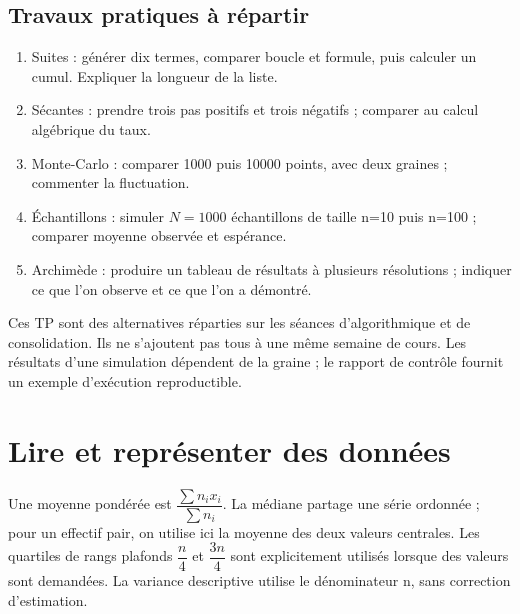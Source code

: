 \subsection*{Travaux pratiques à répartir}\label{TP}
\begin{enumerate}
\item Suites : générer dix termes, comparer boucle et formule, puis calculer un cumul. Expliquer la longueur de la liste.
\item Sécantes : prendre trois pas positifs et trois négatifs ; comparer au calcul algébrique du taux.
\item Monte-Carlo : comparer \num{1000} puis \num{10000} points, avec deux graines ; commenter la fluctuation.
\item Échantillons : simuler $N=\num{1000}$ échantillons de taille n=10 puis n=100 ; comparer moyenne observée et espérance.
\item Archimède : produire un tableau de résultats à plusieurs résolutions ; indiquer ce que l’on observe et ce que l’on a démontré.
\end{enumerate}
Ces TP sont des alternatives réparties sur les séances d’algorithmique et de consolidation. Ils ne s’ajoutent pas tous à une même semaine de cours. Les résultats d’une simulation dépendent de la graine ; le rapport de contrôle fournit un exemple d’exécution reproductible.

\section{Lire et représenter des données}\label{STATS}
Une moyenne pondérée est $\dfrac{\sum n_ix_i}{\sum n_i}$. La médiane partage une série ordonnée ; pour un effectif pair, on utilise ici la moyenne des deux valeurs centrales. Les quartiles de rangs plafonds $\dfrac{n}{4}$ et $\dfrac{3n}{4}$ sont explicitement utilisés lorsque des valeurs sont demandées. La variance descriptive utilise le dénominateur n, sans correction d’estimation.

